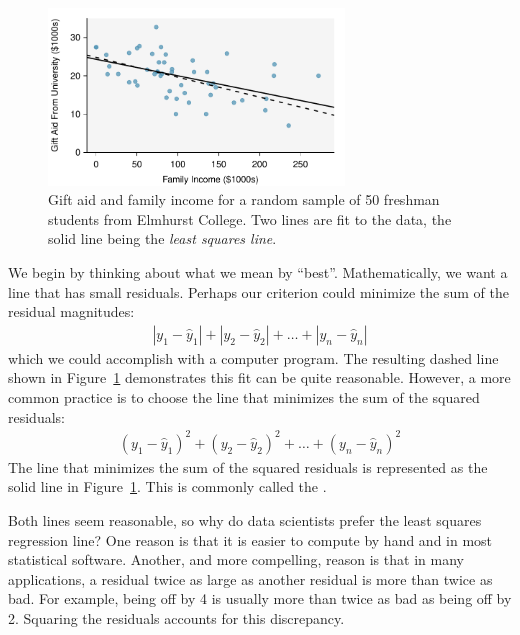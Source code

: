 \begin{figure}[h]
\centering
\includegraphics[width=0.7\textwidth]{ch_regr_simple_linear/figures/elmhurstPlots/elmhurstScatterW2Lines}
\caption{Gift aid and family income for a random sample of 50 freshman students from Elmhurst College. Two lines are fit to the data, the solid line being the \emph{least squares line}.}
\label{elmhurstScatterW2Lines}
\end{figure}


We begin by thinking about what we mean by ``best''. Mathematically, we want a line that has small residuals. Perhaps our criterion could minimize the sum of the residual magnitudes:
\begin{eqnarray*}
|y_1 - \hat{y}_1| + |y_2-\hat{y}_2| + \dots + |y_n-\hat{y}_n|
\label{sumOfAbsoluteValueOfResiduals}
\end{eqnarray*}
which we could accomplish with a computer program. The resulting dashed line shown in Figure~\ref{elmhurstScatterW2Lines} demonstrates this fit can be quite reasonable. However, a more common practice is to choose the line that minimizes the sum of the squared residuals:
\begin{eqnarray*}
(y_1 - \hat{y}_1)^2 + (y_2-\hat{y}_2)^2+ \dots + (y_n-\hat{y}_n)^2
\label{sumOfSquaresForResiduals}
\end{eqnarray*}
The line that minimizes the sum of the squared residuals is represented as the solid line in Figure~\ref{elmhurstScatterW2Lines}. This is commonly called the . 

Both lines seem reasonable, so why do data scientists prefer the least squares regression line?  One reason is that it is easier to compute by hand and in most statistical software.  Another, and more compelling, reason is that in many applications, a residual twice as large as another residual is more than twice as bad. For example, being off by 4 is usually more than twice as bad as being off by 2. Squaring the residuals accounts for this discrepancy.

